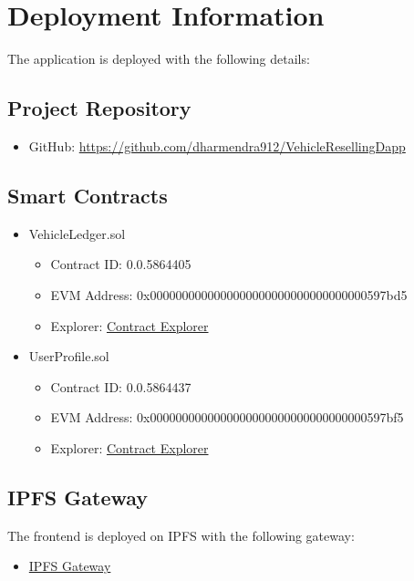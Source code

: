 \documentclass[12pt,a4paper]{article}
\begin{document}
    \section{Deployment Information}
    The application is deployed with the following details:

    \subsection{Project Repository}
    \begin{itemize}
        \item GitHub: \url{https://github.com/dharmendra912/VehicleResellingDapp}
    \end{itemize}

    \subsection{Smart Contracts}
    \begin{itemize}
        \item VehicleLedger.sol
        \begin{itemize}
            \item Contract ID: 0.0.5864405
            \item EVM Address: 0x0000000000000000000000000000000000597bd5
            \item Explorer: \href{https://hashscan.io/testnet/contract/0.0.5864405}{Contract Explorer}
        \end{itemize}

        \item UserProfile.sol
        \begin{itemize}
            \item Contract ID: 0.0.5864437
            \item EVM Address: 0x0000000000000000000000000000000000597bf5
            \item Explorer: \href{https://hashscan.io/testnet/contract/0.0.5864437}{Contract Explorer}
        \end{itemize}
    \end{itemize}

    \label{app:Deployment}

    \subsection{IPFS Gateway}
    The frontend is deployed on IPFS with the following gateway:
    \begin{itemize}
        \item \href{https://w3s.link/ipfs/bafybeib6mrn3k6427rro7b6jauuebgm7ngzk2cycjcuprzjljdzajsvkl4/}{IPFS Gateway}
    \end{itemize}
\end{document}
